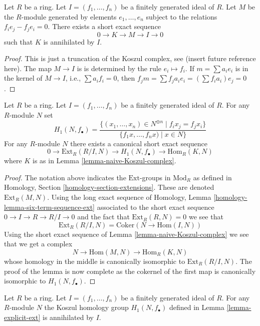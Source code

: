 \begin{lemma}
\label{lemma-naive-Koszul-complex}
Let $R$ be a ring. Let $I = (f_1, \ldots, f_n)$ be a finitely generated ideal
of $R$. Let $M$ be the $R$-module generated by elements
$e_1, \ldots, e_n$ subject to the relations $f_i e_j - f_j e_i = 0$.
There exists a short exact sequence
$$
0 \to K \to M \to I \to 0
$$
such that $K$ is annihilated by $I$.
\end{lemma}

\begin{proof}
This is just a truncation of the Koszul complex, see (insert future
reference here).
The map $M \to I$ is is determined by the rule $e_i \mapsto f_i$. If
$m = \sum a_i e_i$ is in the kernel of $M \to I$, i.e., $\sum a_i f_i = 0$,
then $f_j m = \sum f_j a_i e_i = (\sum f_i a_i) e_j = 0$.
\end{proof}

\begin{lemma}
\label{lemma-explicit-ext}
Let $R$ be a ring. Let $I = (f_1, \ldots, f_n)$ be a finitely generated ideal
of $R$. For any $R$-module $N$ set
$$
H_1(N, f_\bullet) =
\frac{\{(x_1, \ldots, x_n) \in N^{\oplus n} \mid f_i x_j = f_j x_i \}}
{\{f_1x, \ldots, f_nx) \mid x \in N\}}
$$
For any $R$-module $N$ there exists a canonical short exact sequence
$$
0 \to \text{Ext}_R(R/I, N) \to H_1(N, f_\bullet) \to \text{Hom}_R(K, N)
$$
where $K$ is as in
Lemma \ref{lemma-naive-Koszul-complex}.
\end{lemma}

\begin{proof}
The notation above indicates the $\text{Ext}$-groups in $\text{Mod}_R$
as defined in
Homology, Section \ref{homology-section-extensions}.
These are denoted $\text{Ext}_R(M, N)$. Using the long exact sequence of
Homology, Lemma \ref{homology-lemma-six-term-sequence-ext}
associated to the short exact sequence $0 \to I \to R \to R/I \to 0$
and the fact that $\text{Ext}_R(R, N) = 0$ we see that
$$
\text{Ext}_R(R/I, N) =
\text{Coker}(N \longrightarrow \text{Hom}(I, N))
$$
Using the short exact sequence of
Lemma \ref{lemma-naive-Koszul-complex}
we see that we get a complex
$$
N \to \text{Hom}(M, N) \to \text{Hom}_R(K, N)
$$
whose homology in the middle is canonically isomorphic to
$\text{Ext}_R(R/I, N)$. The proof of the lemma is now complete
as the cokernel of the first map
is canonically isomorphic to $H_1(N, f_\bullet)$.
\end{proof}

\begin{lemma}
\label{lemma-koszul-homology-annihilated}
Let $R$ be a ring. Let $I = (f_1, \ldots, f_n)$ be a finitely generated ideal
of $R$. For any $R$-module $N$ the Koszul homology group
$H_1(N, f_\bullet)$ defined in
Lemma \ref{lemma-explicit-ext}
is annihilated by $I$.
\end{lemma}

